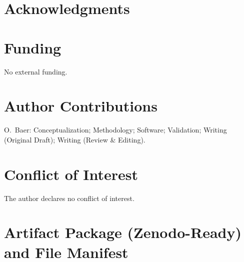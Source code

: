 \documentclass[11pt,a4paper]{article}
\begin{document}
\section*{Acknowledgments}

\section*{Funding}
No external funding.

\section*{Author Contributions}
O.~Baer: Conceptualization; Methodology; Software; Validation; Writing (Original Draft); Writing (Review \& Editing).

\section*{Conflict of Interest}
The author declares no conflict of interest.




\appendix

\section{Artifact Package (Zenodo-Ready) and File Manifest}
\end{document}
